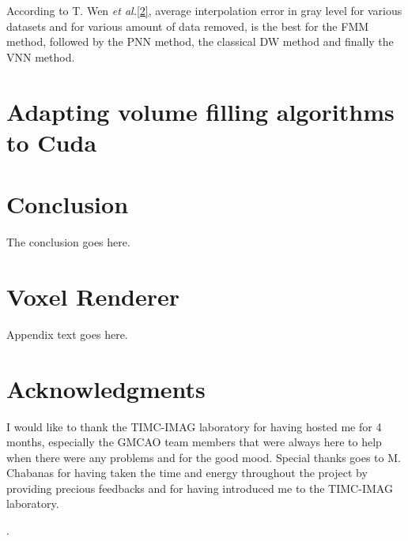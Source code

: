 \documentclass[12pt,journal,compsoc]{IEEEtran}
\begin{document}
According to T. Wen \textit{et al.}\ref{2}, average interpolation error in gray level for various datasets and for various amount of data removed, is the best for the FMM method, followed by the PNN method, the classical DW method and finally the VNN method. 

\section{Adapting volume filling algorithms to Cuda}




\section{Conclusion}
The conclusion goes here.

\appendices
\section{Voxel Renderer}
Appendix text goes here.

\section*{Acknowledgments}
I would like to thank the TIMC-IMAG laboratory for having hosted me for 4 months, especially the GMCAO team members that were always here to help when there were any problems and for the good mood. Special thanks goes to M. Chabanas for having taken the time and energy throughout the project by providing precious feedbacks and for having introduced me to the TIMC-IMAG laboratory.

\cite{1}\cite{2}\cite{3}\cite{4}\cite{5}\cite{6}\cite{7}.





\end{document}
